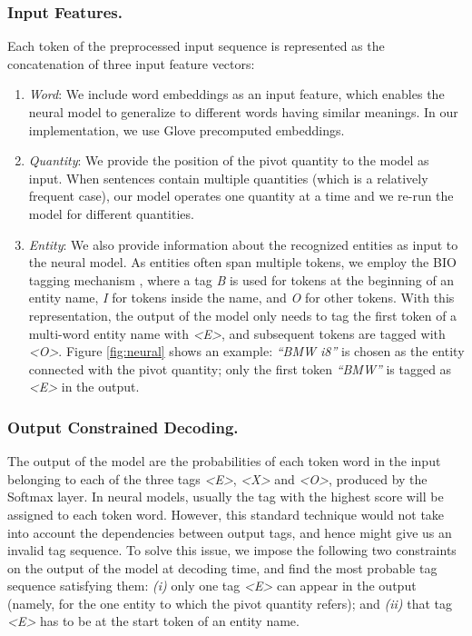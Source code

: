 \subsubsection{Input Features.} Each token of the preprocessed input sequence is represented as the concatenation of three input feature vectors:
\begin{enumerate}[label=(\it\roman*)]
\item \textit{Word}: We include word embeddings as an input feature, which enables the neural model to 
generalize to different words having similar meanings.
In our implementation, we use Glove \cite{DBLP:conf/emnlp/PenningtonSM14} precomputed embeddings.
\item \textit{Quantity}: We provide the position of the 
pivot quantity to the model as input. 
When sentences contain multiple quantities (which is a relatively frequent case), our model operates
one quantity at a time and we re-run the model for different quantities.
\item \textit{Entity}: We also provide information about the recognized entities as input to the neural model. 
As entities often span multiple tokens, we employ the BIO tagging mechanism \cite{DBLP:conf/acl-vlc/RamshawM95}, where a tag \textit{B} is used for tokens at the beginning of an entity name,
\textit{I} for tokens inside the name, and \textit{O} for other tokens. 
With this representation, the output of the model only needs to tag the first token of a multi-word entity name with \textit{<E>}, 
and subsequent tokens are tagged with \textit{<O>}. Figure \ref{fig:neural} shows an example: \textit{``BMW i8''} is chosen as the entity 
connected with the pivot quantity; only the first token \textit{``BMW''} is tagged as \textit{<E>} in the output.
\end{enumerate}

\subsubsection{Output Constrained Decoding.} The output of the model are the probabilities of each token word in the input belonging to each of the three tags \textit{<E>}, \textit{<X>} and \textit{<O>}, produced by the Softmax layer. 
In neural models, usually the tag with the highest score will be assigned to each token word.
However, this standard technique would not take into account the dependencies between output tags, and hence might give us an invalid tag sequence. To solve this issue, we impose the following two constraints on the output of the model at decoding time, and find the most probable tag sequence satisfying them: \textit{(i)} only one tag \textit{<E>} can appear in the output
(namely, for the one entity to which the pivot quantity refers);
and \textit{(ii)} that tag \textit{<E>} has to be at the start token of an entity name. 


